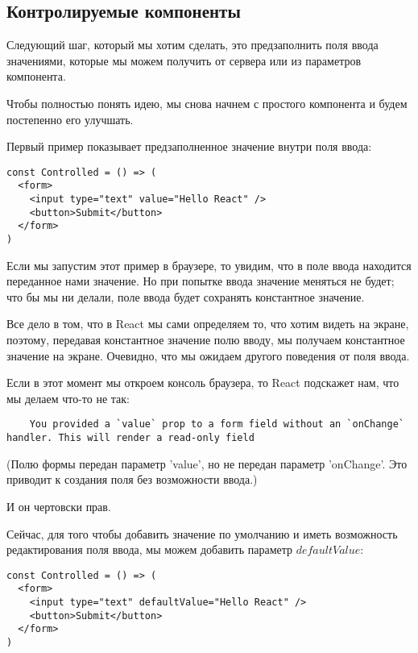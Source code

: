 \subsection{Контролируемые компоненты}

Следующий шаг, который мы хотим сделать, это предзаполнить поля ввода значениями, которые мы можем получить от сервера или из параметров компонента.

Чтобы полностью понять идею, мы снова начнем с простого компонента и будем постепенно его улучшать.

Первый пример показывает предзаполненное значение внутри поля ввода:

\begin{lstlisting}
const Controlled = () => (
  <form>
    <input type="text" value="Hello React" />
    <button>Submit</button>
  </form>
)
\end{lstlisting}

Если мы запустим этот пример в браузере, то увидим, что в поле ввода находится переданное нами значение. Но при попытке ввода значение меняться не будет; что бы мы ни делали, поле ввода будет сохранять константное значение.

Все дело в том, что в React мы сами определяем то, что хотим видеть на экране, поэтому, передавая константное значение полю вводу, мы получаем константное значение на экране. Очевидно, что мы ожидаем другого поведения от поля ввода.

Если в этот момент мы откроем консоль браузера, то React подскажет нам, что мы делаем что-то не так:

\begin{lstlisting}
	You provided a `value` prop to a form field without an `onChange` handler. This will render a read-only field
\end{lstlisting}

(Полю формы передан параметр 'value', но не передан параметр 'onChange'. Это приводит к создания поля без возможности ввода.)

И он чертовски прав.

Сейчас, для того чтобы добавить значение по умолчанию и иметь возможность редактирования поля ввода, мы можем добавить параметр $defaultValue$:

\begin{lstlisting}
const Controlled = () => (
  <form>
    <input type="text" defaultValue="Hello React" />
    <button>Submit</button>
  </form>
)
\end{lstlisting} 

